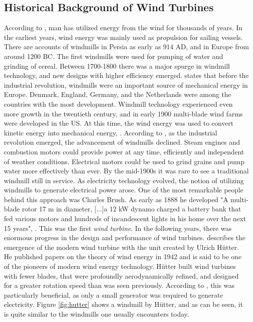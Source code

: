 \subsection{Historical Background of Wind Turbines}
According to \cite{Wagner2013}, man has utilized energy from the wind for thousands of years. In the earliest years, wind energy was mainly used as propulsion for sailing vessels. There are accounts of windmills in Persia as early as 914 AD, and in Europe from around 1200 BC. The first windmills were used for pumping of water and grinding of cereal. Between 1700-1800 there was a major spurge in windmill technology, and new designs with higher efficiency emerged. \cite{Lynn2011} states that before the industrial revolution, windmills were an important source of mechanical energy in Europe. Denmark, England, Germany, and the Netherlands were among the countries with the most development. Windmill technology experienced even more growth in the twentieth century, and in early 1900 multi-blade wind farms were developed in the US. At this time, the wind energy was used to convert kinetic energy into mechanical energy, \cite{Hau2013}. According to \cite{Lynn2011}, as the industrial revolution emerged, the advancement of windmills declined. Steam engines and combustion motors could provide power at any time, efficiently and independent of weather conditions. Electrical motors could be used to grind grains and pump water more effectively than ever. By the mid-1900s it was rare to see a traditional windmill still in service. \newline 
\newline
As electricity technology evolved, the notion of utilizing windmills to generate electrical power arose. One of the most remarkable people behind this approach was Charles Brush. As early as 1888 he developed "A multi-blade rotor 17 m in diameter, [...]a 12 kW dynamo charged a battery bank that fed various motors and hundreds of incandescent lights in his home over the next 15 years", \cite{Lynn2011}. This was the first \textit{wind turbine}. In the following years, there was enormous progress in the design and performance of wind turbines. \cite{Hau2013} describes the emergence of the modern wind turbine with the unit created by Ulrich Hütter. He published papers on the theory of wind energy in 1942 and is said to be one of the pioneers of modern wind energy technology. Hütter built wind turbines with fewer blades, that were profoundly aerodynamically refined, and designed for a greater rotation speed than was seen previously. According to \cite{Wagner2013}, this was particularly beneficial, as only a small generator was required to generate electricity. Figure \ref{fig:hutter} shows a windmill by Hütter, and as can be seen, it is quite similar to the windmills one usually encounters today. \newline
